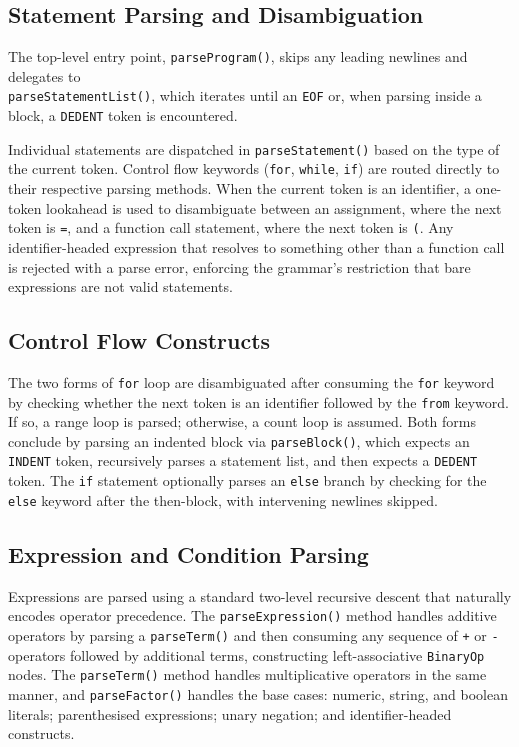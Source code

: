 \subsection{Statement Parsing and Disambiguation}

The top-level entry point, \texttt{parseProgram()}, skips any leading newlines and delegates to \\ \texttt{parseStatementList()}, which iterates until an \texttt{EOF} or, when parsing inside a block, a \texttt{DEDENT} token is encountered.

Individual statements are dispatched in \texttt{parseStatement()} based on the type of the current token. Control flow keywords (\texttt{for}, \texttt{while}, \texttt{if}) are routed directly to their respective parsing methods. When the current token is an identifier, a one-token lookahead is used to disambiguate between an assignment, where the next token is \texttt{=}, and a function call statement, where the next token is \texttt{(}. Any identifier-headed expression that resolves to something other than a function call is rejected with a parse error, enforcing the grammar's restriction that bare expressions are not valid statements.

\subsection{Control Flow Constructs}

The two forms of \texttt{for} loop are disambiguated after consuming the \texttt{for} keyword by checking whether the next token is an identifier followed by the \texttt{from} keyword. If so, a range loop is parsed; otherwise, a count loop is assumed. Both forms conclude by parsing an indented block via \texttt{parseBlock()}, which expects an \texttt{INDENT} token, recursively parses a statement list, and then expects a \texttt{DEDENT} token. The \texttt{if} statement optionally parses an \texttt{else} branch by checking for the \texttt{else} keyword after the then-block, with intervening newlines skipped.

\subsection{Expression and Condition Parsing}

Expressions are parsed using a standard two-level recursive descent that naturally encodes operator precedence. The \texttt{parseExpression()} method handles additive operators by parsing a \texttt{parseTerm()} and then consuming any sequence of \texttt{+} or \texttt{-} operators followed by additional terms, constructing left-associative \texttt{BinaryOp} nodes. The \texttt{parseTerm()} method handles multiplicative operators in the same manner, and \texttt{parseFactor()} handles the base cases: numeric, string, and boolean literals; parenthesised expressions; unary negation; and identifier-headed constructs.

